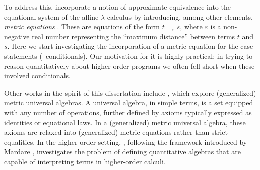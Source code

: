 To address this, \cite{dahlqvistInternalLanguage2022,dahlqvist2023syntactic} incorporate a notion of approximate equivalence into the equational system of the affine $\lambda$-calculus by introducing, among other elements, \emph{metric equations} \cite{mardare2016quantitative, mardare2017axiomatizability}. These are equations of the form $t =_{\varepsilon} s$, where $\varepsilon$ is a non-negative real number representing the ``maximum distance'' between terms $t$ and $s$. Here we start investigating the incorporation of a metric equation for the case statements (\ie\ conditionals). Our motivation for it is highly practical: in trying to reason quantitatively about higher-order programs we often fell short when these involved conditionals.


Other works in the spirit of this dissertation include \cite{mardare2016quantitative, mardare2017axiomatizability, mio24, jurka24}, which explore (generalized) metric universal algebras. A universal algebra, in simple terms, is a set equipped with any number of operations, further defined  by axioms typically expressed as identities or equational laws. In a (generalized) metric universal algebra, these axioms are relaxed into (generalized) metric equations rather than strict equalities. In the higher-order setting, \cite{lago22}, following the framework introduced by Mardare \cite{mardare2016quantitative}, investigates the problem of defining quantitative algebras that are capable of interpreting terms in higher-order calculi.



\begin{comment}
Remarkably a number of important results already considered additive structure
in the quantalic setting, even if sometimes implicitly.
References~\cite{mardare2016quantitative,mardare2017axiomatizability,mio24,jurka24}
for example are framed in the setting of universal algebra and therefore
involve additive conjunction (\ie\ $\&$), typically interpreted via categorical
products.  In the higher-order setting, \cite{lago22} enforces additive
conjunction to be left adjoint to implication (interpreted via
Cartesian-closedness), with a series of negative results emerging from this.
Our work is orthogonal to these in that we study the dual of $\&$ (\ie\
$\oplus$) and furthermore we assume the left adjoint of implication to be
multiplicative conjunction (\ie\ $\otimes$) instead of the additive
counterpart. Among other things, this removes the obstacles discussed
in~\cite{lago22}.
\end{comment}



